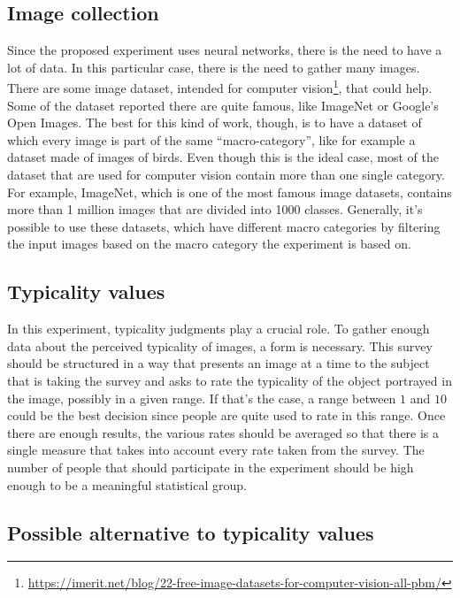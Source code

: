 \documentclass[conference]{IEEEtran}
\begin{document}
		\subsection{Image collection}
			
			\noindent Since the proposed experiment uses neural networks, there is the need to have a lot of data. In this particular case, there is the need to gather many images. There are some image dataset, intended for computer 
			vision\footnote{\url{https://imerit.net/blog/22-free-image-datasets-for-computer-vision-all-pbm/}}, that could help. Some of the dataset reported there are quite famous, like ImageNet or Google's Open Images. The 
			best for this kind of work, though, is to have a dataset of which every image is part of the same ``macro-category'', like for example a dataset made of images of birds. Even though this is the ideal case,
			most of the dataset that are used for computer vision contain more than one single category. For example, ImageNet, which is one of the most famous image datasets, contains more than 1 million images that are divided 
			into 1000 classes. Generally, it's possible to use these datasets, which have different macro categories by filtering the input images based on the macro category the experiment is based on.
		
		\subsection{Typicality values\label{sec:typval}}
			
			\noindent In this experiment, typicality judgments play a crucial role. To gather enough data about the perceived typicality of images, a form is necessary. This survey should be structured in a way that presents an 
			image at a time to the subject that is taking the survey and asks to rate the typicality of the object portrayed in the image, possibly in a given range. If that's the case, a range between $1$ and $10$ 
			could be the best decision since people are quite used to rate in this range. Once there are enough results, the various rates should be averaged so that there is a single measure that takes into 
			account every rate taken from the survey. The number of people that should participate in the experiment should be high enough to be a meaningful statistical group.
			
			
		\subsection{Possible alternative to typicality values\label{sec:patv}}
		
\end{document}
